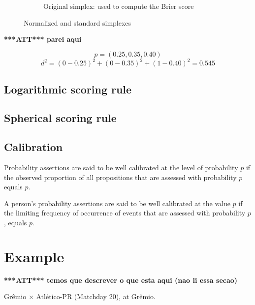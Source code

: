 \documentclass[journal,article,accept,moreauthors,pdftex,12pt,a4paper]{mdpi}
\newcommand{\red}[1]{\textbf{\color{red} ***ATT*** #1}}
\begin{document}
\begin{figure}[!ht]
\begin{subfigure}[b]{0.48\linewidth}


        \caption{Original simplex: used to compute the Brier score}
        \label{fig:B}
    \end{subfigure}
    \caption{Normalized and standard simplexes}
    \label{fig:norm_stand}
\end{figure}



\red{parei aqui}

\[p=(0.25,0.35,0.40)\]
\[d^2=(0-0.25)^2+(0-0.35)^2+(1-0.40)^2=0.545\]



\subsection{Logarithmic scoring rule} 

\subsection{Spherical scoring rule}


\subsection{Calibration}

Probability assertions are said to be well calibrated at the level of probability $p$ if the observed proportion of all propositions that are assessed with probability $p$ equals $p$.

A person's probability assertions are said to be well calibrated at the value $p$ if the limiting frequency of occurrence of events that are assessed with probability $p$, equals $p$.


\section{Example}

\red{temos que descrever o que esta aqui (nao li essa secao)}

Gr\^emio $\times$ Atl\'etico-PR (Matchday 20), at Gr\^emio.
\end{document}

